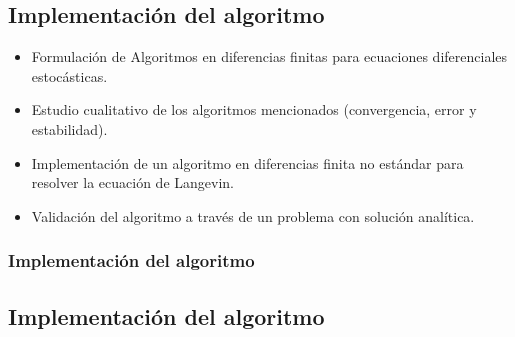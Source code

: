   \subsection*{Implementaci\'on del algoritmo}
	\begin{itemize}
	  \item Formulaci\'on de Algoritmos en diferencias finitas para ecuaciones diferenciales estoc\'asticas.
	  \item Estudio cualitativo de los algoritmos mencionados (convergencia, error y estabilidad). 
	  \item Implementaci\'on  de un algoritmo en diferencias finita no est\'andar para resolver la ecuaci\'on de Langevin.
	  \item Validaci\'on del algoritmo a través de un problema con soluci\'on analítica.
	\end{itemize}
\begin{frame}
  \frametitle{Implementaci\'on del algoritmo}
  \subsection{Implementaci\'on del algoritmo}
  \begin{block}

  \end{block}
\end{frame}
